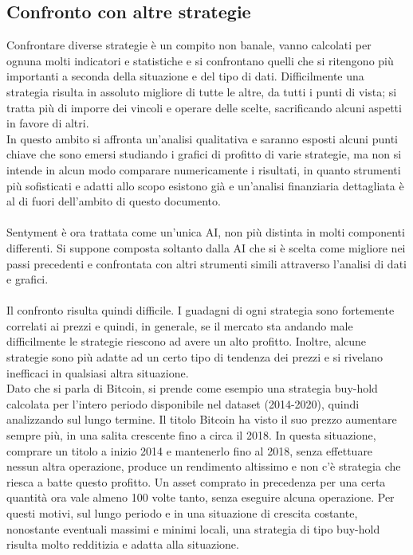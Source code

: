 \documentclass[a4paper,12pt]{report}
\begin{document}
\begin{fig}
\section{Confronto con altre strategie}
Confrontare diverse strategie è un compito non banale, vanno calcolati per ognuna molti indicatori e statistiche e si confrontano quelli che si ritengono più importanti a seconda della situazione e del tipo di dati. Difficilmente una strategia risulta in assoluto migliore di tutte le altre, da tutti i punti di vista; si tratta più di imporre dei vincoli e operare delle scelte, sacrificando alcuni aspetti in favore di altri.\\ In questo ambito si affronta un'analisi qualitativa e saranno esposti alcuni punti chiave che sono emersi studiando i grafici di profitto di varie strategie, ma non si intende in alcun modo comparare numericamente i risultati, in quanto strumenti più sofisticati e adatti allo scopo esistono già e un'analisi finanziaria dettagliata è al di fuori dell'ambito di questo documento.\\~\\Sentyment è ora trattata come un'unica AI, non più distinta in molti componenti differenti. Si suppone composta soltanto dalla AI che si è scelta come migliore nei passi precedenti e confrontata con altri strumenti simili attraverso l'analisi di dati e grafici.\\~\\ Il confronto risulta quindi difficile. I guadagni di ogni strategia sono fortemente correlati ai prezzi e quindi, in generale, se il mercato sta andando male difficilmente le strategie riescono ad avere un alto profitto. Inoltre, alcune strategie sono più adatte ad un certo tipo di tendenza dei prezzi e si rivelano inefficaci in qualsiasi altra situazione.\\ Dato che si parla di Bitcoin, si prende come esempio una strategia buy-hold calcolata per l'intero periodo disponibile nel dataset (2014-2020), quindi analizzando sul lungo termine. Il titolo Bitcoin ha visto il suo prezzo aumentare sempre più, in una salita crescente fino a circa il 2018. In questa situazione, comprare un titolo a inizio 2014 e mantenerlo fino al 2018, senza effettuare nessun altra operazione, produce un rendimento altissimo e non c'è strategia che riesca a batte questo profitto. Un asset comprato in precedenza per una certa quantità ora vale almeno 100 volte tanto, senza eseguire alcuna operazione. Per questi motivi, sul lungo periodo e in una situazione di crescita costante, nonostante eventuali massimi e minimi locali, una strategia di tipo buy-hold risulta molto redditizia e adatta alla situazione.

\end{fig}
\end{document}
